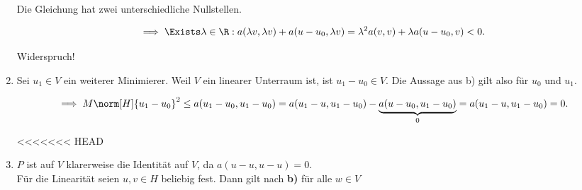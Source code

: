 \begin{solution}
\begin{enumerate}[label = \textbf{\alph*)}]
  Die Gleichung hat zwei unterschiedliche Nullstellen.

  \begin{align*}
    \implies
    \Exists \lambda \in \R:
    a(\lambda v, \lambda v) + a(u - u_0, \lambda v)
    =
    \lambda^2 a(v,v) + \lambda a(u - u_0, v) < 0.
  \end{align*}

  Widerspruch!

  \item Sei $u_1 \in V$ ein weiterer Minimierer.
  Weil $V$ ein linearer Unterraum ist, ist $u_1 - u_0 \in V$.
  Die Aussage aus b) gilt also für $u_0$ und $u_1$.

  \begin{align*}
    \implies
    M \norm[H]{u_1 - u_0}^2
    \leq
    a(u_1 - u_0, u_1 - u_0)
    =
    a(u_1 - u, u_1 - u_0)
    -
    \underbrace{a(u - u_0, u_1 - u_0)}_0
    =
    a(u_1 - u, u_1 - u_0) = 0.
  \end{align*}

<<<<<<< HEAD
  \item $P$ ist auf $V$ klarerweise die Identität auf $V$, da $a(u - u, u - u) = 0$. \\
  Für die Linearität seien $u, v \in H$ beliebig fest. Dann gilt nach \textbf{b)} für alle $w \in V$


\end{enumerate}
\end{solution}
